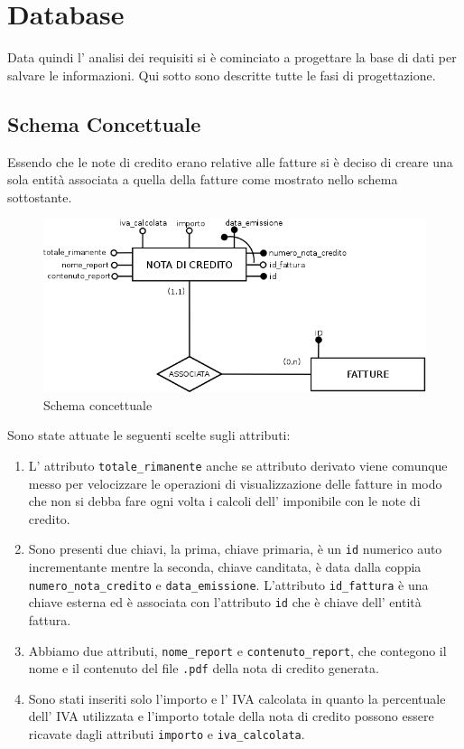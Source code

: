 \documentclass[12pt]{book}
\begin{document}
\section{Database}
Data quindi l' analisi dei requisiti si è cominciato a progettare la base di 
dati per salvare le informazioni.
Qui sotto sono descritte tutte le fasi di progettazione.
\subsection{Schema Concettuale}
Essendo che le note di credito erano relative alle fatture si è deciso di 
creare una sola entità associata a quella della fatture come mostrato nello 
schema sottostante.
\begin{figure}[H]
    \centering
    \includegraphics[scale=0.5]{img/schema_concettuale}
    \caption{Schema concettuale}\label{schema:concettuale}
\end{figure}
Sono state attuate le seguenti scelte sugli attributi:
\begin{enumerate}
    \item L' attributo \texttt{totale\_rimanente} anche se attributo 
        derivato viene comunque messo per velocizzare le operazioni di 
        visualizzazione delle fatture in modo che non si debba fare ogni volta 
        i calcoli dell’ imponibile con le note di credito.
    \item Sono presenti due chiavi, la prima, chiave primaria, è un \texttt{id} 
        numerico auto incrementante mentre la seconda, chiave canditata, è 
        data dalla coppia \texttt{numero\_nota\_credito} e 
        \texttt{data\_emissione}.
        L'attributo \texttt{id\_fattura} è una chiave esterna ed è associata 
        con l'attributo \texttt{id} che è chiave dell' entità fattura.
    \item Abbiamo due attributi, \texttt{nome\_report} e 
        \texttt{contenuto\_report}, che contegono il nome e il contenuto 
        del file \texttt{.pdf} della nota di credito generata.
    \item Sono stati inseriti solo l’importo e l’ IVA calcolata in 
        quanto la percentuale dell’ IVA utilizzata e l’importo totale della 
        nota di credito possono essere ricavate dagli attributi \texttt{importo}
        e \texttt{iva\_calcolata}.
\end{enumerate}
\end{document}
